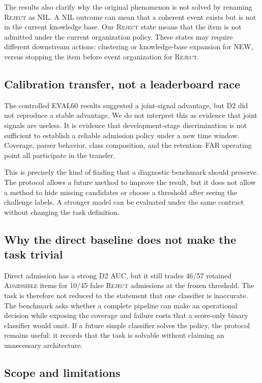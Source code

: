 \documentclass[5p,times]{elsarticle}
\newcommand{\admissible}{\mbox{\textsc{Admissible}}}
\newcommand{\reject}{\mbox{\textsc{Reject}}}
\begin{document}
The results also clarify why the original phenomenon is not solved by renaming \reject{} as NIL. A NIL outcome can mean that a coherent event exists but is not in the current knowledge base. Our \reject{} state means that the item is not admitted under the current organization policy. These states may require different downstream actions: clustering or knowledge-base expansion for NEW, versus stopping the item before event organization for \reject{}.

\subsection{Calibration transfer, not a leaderboard race}

The controlled EVAL60 results suggested a joint-signal advantage, but D2 did not reproduce a stable advantage. We do not interpret this as evidence that joint signals are useless. It is evidence that development-stage discrimination is not sufficient to establish a reliable admission policy under a new time window. Coverage, parser behavior, class composition, and the retention--FAR operating point all participate in the transfer.

This is precisely the kind of finding that a diagnostic benchmark should preserve. The protocol allows a future method to improve the result, but it does not allow a method to hide missing candidates or choose a threshold after seeing the challenge labels. A stronger model can be evaluated under the same contract without changing the task definition.

\subsection{Why the direct baseline does not make the task trivial}

Direct admission has a strong D2 AUC, but it still trades 46/57 retained \admissible{} items for 10/45 false \reject{} admissions at the frozen threshold. The task is therefore not reduced to the statement that one classifier is inaccurate. The benchmark asks whether a complete pipeline can make an operational decision while exposing the coverage and failure costs that a score-only binary classifier would omit. If a future simple classifier solves the policy, the protocol remains useful: it records that the task is solvable without claiming an unnecessary architecture.

\subsection{Scope and limitations}
\end{document}
